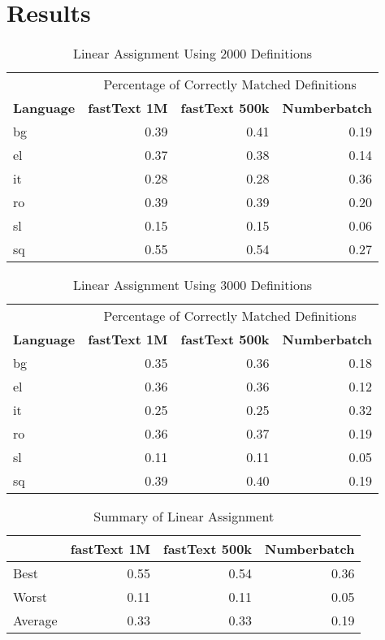 \section{Results}%
\label{sec:chap3_results}

\begin{table}[htbp]
    \centering
    \begin{tabular}{lrrr}
        \toprule
& \multicolumn{3}{c}{Percentage of Correctly Matched Definitions} \\
\cmidrule(lr){2-4}
        \textbf{Language} & \textbf{fastText 1M} & \textbf{fastText 500k} & \textbf{Numberbatch} \\
        \midrule
        bg & 0.39 & 0.41 & 0.19 \\
        el & 0.37 & 0.38 & 0.14 \\
        it & 0.28 & 0.28 & 0.36 \\
        ro & 0.39 & 0.39 & 0.20 \\
        sl & 0.15 & 0.15 & 0.06 \\
        sq & 0.55 & 0.54 & 0.27 \\
        \bottomrule
    \end{tabular}
    \caption{Linear Assignment Using 2000 Definitions}%
    \label{tab:lapjv_2000}
\end{table}

\begin{table}[htbp]
    \centering
    \begin{tabular}{lrrr}
        \toprule
& \multicolumn{3}{c}{Percentage of Correctly Matched Definitions} \\
\cmidrule(lr){2-4}
        \textbf{Language} & \textbf{fastText 1M} & \textbf{fastText 500k} & \textbf{Numberbatch} \\
        bg & 0.35 & 0.36 & 0.18 \\
        el & 0.36 & 0.36 & 0.12 \\
        it & 0.25 & 0.25 & 0.32 \\
        ro & 0.36 & 0.37 & 0.19 \\
        sl & 0.11 & 0.11 & 0.05 \\
        sq & 0.39 & 0.40 & 0.19 \\
        \bottomrule
    \end{tabular}
    \caption{Linear Assignment Using 3000 Definitions}%
    \label{tab:lapjv_3000}
\end{table}

\begin{table}[htbp]
    \centering
    \begin{tabular}{lrrr}
        \toprule
& \textbf{fastText 1M} & \textbf{fastText 500k} & \textbf{Numberbatch} \\
\midrule
        Best & 0.55 & 0.54 & 0.36 \\
        Worst & 0.11 & 0.11 & 0.05 \\
        Average & 0.33 & 0.33 & 0.19 \\
        \bottomrule
    \end{tabular}
    \caption{Summary of Linear Assignment}%
    \label{tab:lapjv_summary}
\end{table}


